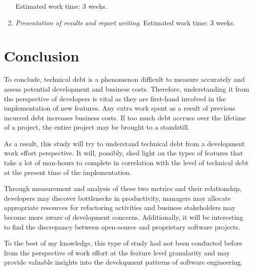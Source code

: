 \documentclass{mprop}
\begin{document}
\begin{enumerate}
	Estimated work time: 3 weeks.\\

	\item \textit{Presentation of results and report writing}.
	Estimated work time: 3 weeks.\\

\end{enumerate}

\section{Conclusion}

To conclude, technical debt is a phenomenon difficult to measure accurately and
assess potential development and business costs. Therefore, understanding it
from the perspective of developers is vital as they are first-hand involved in
the implementation of new features. Any extra work spent as a result of previous
incurred debt increases business costs. If too much debt accrues over the
lifetime of a project, the entire project may be brought to a standstill.

As a result, this study will try to understand technical debt from a development
work effort perspective. It will, possibly, shed light on the types of features
that take a lot of man-hours to complete in correlation with the level of
technical debt at the present time of the implementation. 

Through measurement and analysis of these two metrics and their relationship,
developers may discover bottlenecks in productivity, managers may allocate
appropriate resources for refactoring activities and business stakeholders may
become more aware of development concerns. Additionally, it will be interesting
to find the discrepancy between open-source and proprietary software projects.

To the best of my knowledge, this type of study had not been conducted before
from the perspective of work effort at the feature level granularity and may
provide valuable insights into the development patterns of software engineering.

\pagebreak


\end{document}
